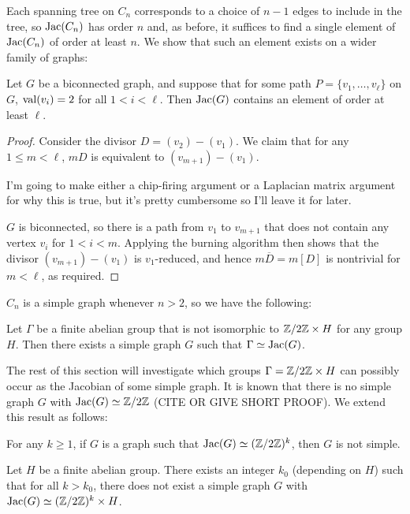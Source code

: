 \documentclass{amsart}
\begin{document}
Each spanning tree on $C_n$ corresponds to a choice of $n-1$ edges to
include in the tree, so $\operatorname{Jac}(C_n)$ has order $n$ and, as before, it
suffices to find a single element of $\operatorname{Jac}(C_n)$ of order at least
$n$. We show that such an element exists on a wider family of graphs:

\begin{lem}
  \label{lem:2valent_path}
  Let $G$ be a biconnected graph, and suppose that for some path $P =
  \{v_1, \ldots, v_\ell\}$ on $G$, $\operatorname{val}(v_i) = 2$ for all $1 < i <
  \ell$. Then $\operatorname{Jac}(G)$ contains an element of order at least $\ell$.
\end{lem}
\begin{proof}
  Consider the divisor $D = (v_2) - (v_1)$. We claim that for any $1
  \le m < \ell$, $mD$ is equivalent to $(v_{m+1}) - (v_1)$.

  I'm going to make either a chip-firing argument or a Laplacian
  matrix argument for why this is true, but it's pretty cumbersome so
  I'll leave it for later.

  $G$ is biconnected, so there is a path from $v_1$ to $v_{m+1}$ that
  does not contain any vertex $v_i$ for $1 < i < m$. Applying the
  burning algorithm then shows that the divisor $(v_{m+1}) - (v_1)$ is
  $v_1$-reduced, and hence $m\overline{D} = m[D]$ is nontrivial for $m
  < \ell$, as required.
\end{proof}

$C_n$ is a simple graph whenever $n > 2$, so we have the following:

\begin{cor}
  Let $\Gamma$ be a finite abelian group that is not isomorphic to
  $\mathbb{Z}/2\mathbb{Z} \times H$ for any group $H$. Then there exists a simple
  graph $G$ such that $\Gamma \simeq \operatorname{Jac}(G)$.
\end{cor}

The rest of this section will investigate which groups $\Gamma =
\mathbb{Z}/2\mathbb{Z} \times H$ can possibly occur as the Jacobian of some simple
graph. It is known that there is no simple graph $G$ with $\operatorname{Jac}(G)
\simeq \mathbb{Z}/2\mathbb{Z}$ (CITE OR GIVE SHORT PROOF). We extend this result as
follows:

\begin{thm}
  \label{thm:2group}
  For any $k \ge 1$, if $G$ is a graph such that $\operatorname{Jac}(G) \simeq
  (\mathbb{Z}/2\mathbb{Z})^k$, then $G$ is not simple.
\end{thm}

\begin{thm}
  \label{thm:2group_product}
  Let $H$ be a finite abelian group. There exists an integer $k_0$
  (depending on $H$) such that for all $k > k_0$, there does not exist
  a simple graph $G$ with $\operatorname{Jac}(G) \simeq (\mathbb{Z}/2\mathbb{Z})^k \times H$.
\end{thm}
\end{document}

